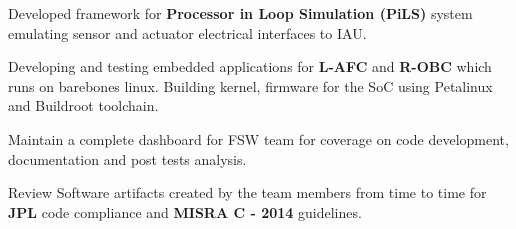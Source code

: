 \begin{cventries}
{\begin{cvitems}
			\item{Developed framework for \textbf{Processor in Loop Simulation (PiLS)} system emulating sensor and actuator electrical interfaces to IAU.}
			\item{Developing and testing embedded applications for \textbf{L-AFC} and \textbf{R-OBC} which runs on barebones linux. Building kernel, firmware for the SoC using Petalinux and Buildroot toolchain.}
			\item{Maintain a complete dashboard for FSW team for coverage on code development, documentation and post tests analysis.}
			\item{Review Software artifacts created by the team members from time to time for \textbf{JPL} code compliance and \textbf{MISRA C - 2014} guidelines.}
		\end{cvitems}
	}
\end{cventries}
